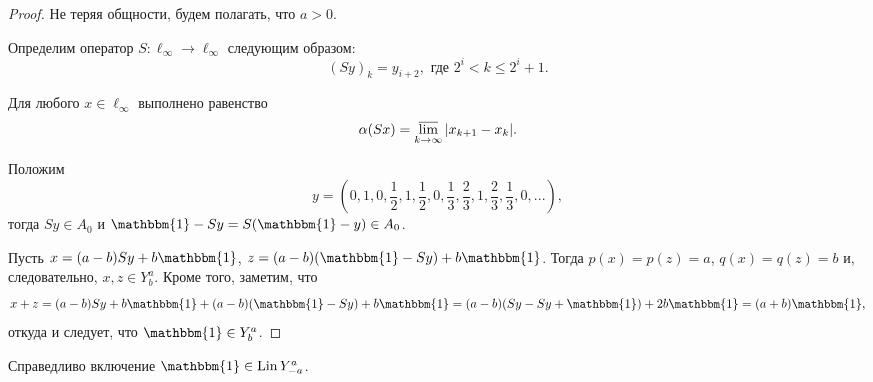 \begin{proof}
	Не теряя общности, будем полагать, что $a>0$.

	Определим оператор $S:\ell_\infty \to \ell_\infty$ следующим образом:
	\begin{equation}\label{operator_S}
		(Sy)_k = y_{i+2}, \mbox{ где } 2^i < k \leq 2^i+1
		.
	\end{equation}
	\begin{lemma}
		Для любого $x\in \ell_\infty$ выполнено равенство
		\begin{equation}\label{alpha_S}
			\alpha(Sx) = \varlimsup_{k\to\infty} |x_{k+1} - x_{k}|
			.
		\end{equation}
	\end{lemma}
	Положим
	\begin{equation}
		\label{eq:y_for_s_alpha}
		y = \left(0,1,0,\frac{1}{2},1,\frac{1}{2},0,\frac{1}{3},\frac{2}{3},1,\frac{2}{3},\frac{1}{3},0,...\right)
		,
	\end{equation}
	тогда $Sy\in A_0$ и $\mathbbm{1}-Sy = S(\mathbbm{1}-y)\in A_0$.

	Пусть $x=(a-b)Sy+b\mathbbm{1}$, $z=(a-b)(\mathbbm{1}-Sy)+b\mathbbm{1}$.
	Тогда $p(x)=p(z)=a$, $q(x)=q(z)=b$ и, следовательно, $x,z\in Y^a_b$.
	Кроме того, заметим, что
	\begin{equation}
		x+z = (a-b)Sy+b\mathbbm{1} + (a-b)(\mathbbm{1}-Sy)+b\mathbbm{1}
		=
		(a-b)(Sy-Sy+\mathbbm{1}) + 2 b\mathbbm{1} = (a+b)\mathbbm{1}
		,
	\end{equation}
	откуда и следует, что $\mathbbm{1}\in Y^a_b$.
\end{proof}


\begin{lemma}
	\label{lem:const_Lin_alpha_0_a_eq_-b}
	Справедливо включение
	$\mathbbm{1}\in \operatorname{Lin} Y^a_{-a}$.
\end{lemma}

